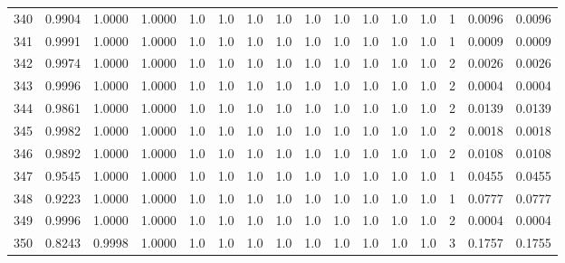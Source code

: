 \begin{tabular}{lrrrrrrrrrrrrrrr}
340 &      0.9904 &  1.0000 &  1.0000 &     1.0 &     1.0 &     1.0 &     1.0 &     1.0 &     1.0 &     1.0 &      1.0 &        1.0 &      1 &                    0.0096 &                     0.0096 \\
341 &      0.9991 &  1.0000 &  1.0000 &     1.0 &     1.0 &     1.0 &     1.0 &     1.0 &     1.0 &     1.0 &      1.0 &        1.0 &      1 &                    0.0009 &                     0.0009 \\
342 &      0.9974 &  1.0000 &  1.0000 &     1.0 &     1.0 &     1.0 &     1.0 &     1.0 &     1.0 &     1.0 &      1.0 &        1.0 &      2 &                    0.0026 &                     0.0026 \\
343 &      0.9996 &  1.0000 &  1.0000 &     1.0 &     1.0 &     1.0 &     1.0 &     1.0 &     1.0 &     1.0 &      1.0 &        1.0 &      2 &                    0.0004 &                     0.0004 \\
344 &      0.9861 &  1.0000 &  1.0000 &     1.0 &     1.0 &     1.0 &     1.0 &     1.0 &     1.0 &     1.0 &      1.0 &        1.0 &      2 &                    0.0139 &                     0.0139 \\
345 &      0.9982 &  1.0000 &  1.0000 &     1.0 &     1.0 &     1.0 &     1.0 &     1.0 &     1.0 &     1.0 &      1.0 &        1.0 &      2 &                    0.0018 &                     0.0018 \\
346 &      0.9892 &  1.0000 &  1.0000 &     1.0 &     1.0 &     1.0 &     1.0 &     1.0 &     1.0 &     1.0 &      1.0 &        1.0 &      2 &                    0.0108 &                     0.0108 \\
347 &      0.9545 &  1.0000 &  1.0000 &     1.0 &     1.0 &     1.0 &     1.0 &     1.0 &     1.0 &     1.0 &      1.0 &        1.0 &      1 &                    0.0455 &                     0.0455 \\
348 &      0.9223 &  1.0000 &  1.0000 &     1.0 &     1.0 &     1.0 &     1.0 &     1.0 &     1.0 &     1.0 &      1.0 &        1.0 &      1 &                    0.0777 &                     0.0777 \\
349 &      0.9996 &  1.0000 &  1.0000 &     1.0 &     1.0 &     1.0 &     1.0 &     1.0 &     1.0 &     1.0 &      1.0 &        1.0 &      2 &                    0.0004 &                     0.0004 \\
350 &      0.8243 &  0.9998 &  1.0000 &     1.0 &     1.0 &     1.0 &     1.0 &     1.0 &     1.0 &     1.0 &      1.0 &        1.0 &      3 &                    0.1757 &                     0.1755 \\

\end{tabular}
